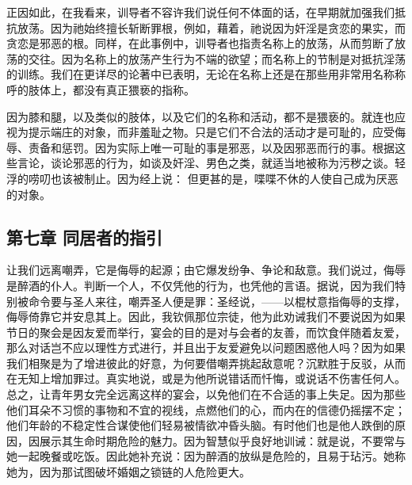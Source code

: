 正因如此，在我看来，训导者不容许我们说任何不体面的话，在早期就加强我们抵抗放荡。因为祂始终擅长斩断罪根，例如，藉着，祂说因为奸淫是贪恋的果实，而贪恋是邪恶的根。同样，在此事例中，训导者也指责名称上的放荡，从而剪断了放荡的交往。因为名称上的放荡产生行为不端的欲望；而名称上的节制是对抵抗淫荡的训练。我们在更详尽的论著中已表明，无论在名称上还是在那些用非常用名称称呼的肢体上，都没有真正猥亵的指称。\par

因为膝和腿，以及类似的肢体，以及它们的名称和活动，都不是猥亵的。就连也应视为提示端庄的对象，而非羞耻之物。只是它们不合法的活动才是可耻的，应受侮辱、责备和惩罚。因为实际上唯一可耻的事是邪恶，以及因邪恶而行的事。根据这些言论，谈论邪恶的行为，如谈及奸淫、男色之类，就适当地被称为污秽之谈。轻浮的唠叨也该被制止。因为经上说：     但更甚的是，喋喋不休的人使自己成为厌恶的对象。 \par


\subsection{第七章 同居者的指引}

让我们远离嘲弄，它是侮辱的起源；由它爆发纷争、争论和敌意。我们说过，侮辱是醉酒的仆人。判断一个人，不仅凭他的行为，也凭他的言语。据说，因为我们特别被命令要与圣人来往，嘲弄圣人便是罪：圣经说，——以棍杖意指侮辱的支撑，侮辱倚靠它并安息其上。因此，我钦佩那位宗徒，他为此劝诫我们不要说因为如果节日的聚会是因友爱而举行，宴会的目的是对与会者的友善，而饮食伴随着友爱，那么对话岂不应以理性方式进行，并且出于友爱避免以问题困惑他人吗？因为如果我们相聚是为了增进彼此的好意，为何要借嘲弄挑起敌意呢？沉默胜于反驳，从而在无知上增加罪过。真实地说，或是为他所说错话而忏悔，或说话不伤害任何人。总之，让青年男女完全远离这样的宴会，以免他们在不合适的事上失足。因为那些他们耳朵不习惯的事物和不宜的视线，点燃他们的心，而内在的信德仍摇摆不定；他们年龄的不稳定性合谋使他们轻易被情欲冲昏头脑。有时他们也是他人跌倒的原因，因展示其生命时期危险的魅力。因为智慧似乎良好地训诫：就是说，不要常与她一起晚餐或吃饭。因此她补充说：因为醉酒的放纵是危险的，且易于玷污。她称她为，因为那试图破坏婚姻之锁链的人危险更大。\par

